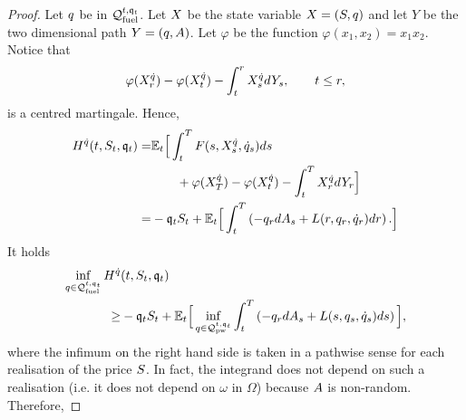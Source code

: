 \documentclass[10pt,a4paper]{article}
\begin{document}
	
	\begin{proof}
		Let $q$ be in $\mathcal{Q}_{\text{fuel}}^{t,\mathfrak{q}_t}$. Let $X$ be the state variable  $X = (S,q)$ and let $Y$ be the two dimensional path $Y=(q,A)$. Let $\varphi$ be the function $\varphi(x_1,x_2)=x_1 x_2$. Notice that 
		\begin{equation*}
		\varphi(X^{\dot{q}}_{r} ) - \varphi(X^{\dot{q}}_{t})
		-\int_{t}^{r}X^{\dot{q}}_s dY_s, \qquad t\leq r,
		\end{equation*}
		is a centred martingale. Hence,
		\begin{equation*}
		\begin{split}
		H^{\dot{q}} (t,S_t,\mathfrak{q}_t) = &
		\mathbb{{E}}_t \Big[
		\int_{t}^{T} F(s,X^{\dot{q}}_s, \dot{q}_s) ds \\
		& \qquad + \varphi (X^{\dot{q}}_T)
		- \varphi (X^{\dot{q}}_t)
		-\int_{t}^{T} X^{\dot{q}}_r dY_r 
		\Big] \\
		=& - \mathfrak{q}_t S_t 
		+\mathbb{{E}}_t \Big[
		\int_{t}^{T} \left(-q_r dA_s + L(r,q_r,\dot{q}_r)dr\right).
		\Big]
		\end{split}
		\end{equation*}
		It holds
		\begin{equation*}
		\begin{split}
		\inf_{q\in \mathcal{Q}_{\text{fuel}}^{t,\mathfrak{q}_t}}
		H^{\dot{q}} &(t,S_t,\mathfrak{q}_t)\\
		\geq& 
		-\mathfrak{q}_t S_t
		+ \mathbb{{E}}_t \Big[
		\inf_{q \in \mathcal{Q}_{\text{pw}}^{t,\mathfrak{q}_t}}
		\int_{t}^{T} \left(-q_r dA_s + L(s,q_s,\dot{q}_s)ds\right)
		\Big],
		\end{split}
		\end{equation*}
		where the infimum on the right hand side is taken in a pathwise sense for each realisation of the price $S$. In fact, the integrand does not depend on such a realisation (i.e. it does not depend on $\omega$ in $\Omega$) because $A$ is non-random. Therefore, 

\end{proof}
\end{document}
